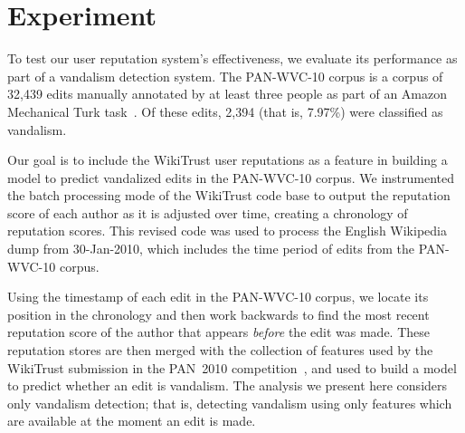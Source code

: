 \section{Experiment}

To test our user reputation system's effectiveness, we
evaluate its performance as part of a vandalism
detection system.
The PAN-WVC-10 corpus is a corpus of 32,439 edits manually
annotated by at least three people as part of an Amazon
Mechanical Turk task~\cite{Potthast2010a}.
Of these edits, 2,394 (that is, 7.97\%) were classified as vandalism.

Our goal is to include the WikiTrust user reputations as a
feature in building a model to predict vandalized edits in
the PAN-WVC-10 corpus.
We instrumented the batch processing mode of the WikiTrust
code base to output the reputation score of each author as
it is adjusted over time, creating a chronology of reputation scores.
This revised code was used to process the English Wikipedia
dump from 30-Jan-2010, which includes the time period of
edits from the PAN-WVC-10 corpus.

Using the timestamp of each edit in the PAN-WVC-10 corpus,
we locate its position in the chronology and then work backwards
to find the most recent reputation score of the author
that appears \textit{before} the edit was made.
These reputation stores are then merged with the collection
of features used by the WikiTrust submission in the PAN~2010
competition~\cite{Adler2010}, and used to build a model to predict
whether an edit is vandalism.
The analysis we present here considers only  vandalism
detection; that is, detecting vandalism using only features which are
available at the moment an edit is made.


